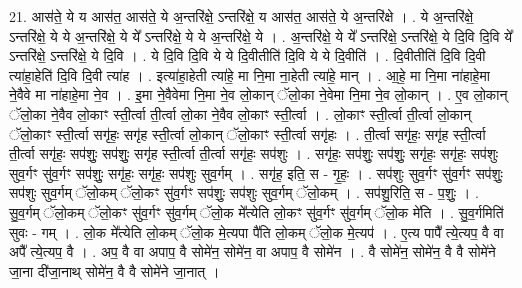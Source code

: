 \documentclass[17pt]{extarticle}
\begin{document}
21. आस॑ते॒ ये य आस॑त॒ आस॑ते॒ ये अ॒न्तरि॑क्षे॒ ऽन्तरि॑क्षे॒ य आस॑त॒ आस॑ते॒ ये अ॒न्तरि॑क्षे । . ये अ॒न्तरि॑क्षे॒ ऽन्तरि॑क्षे॒ ये ये अ॒न्तरि॑क्षे॒ ये ये᳚ ऽन्तरि॑क्षे॒ ये ये अ॒न्तरि॑क्षे॒ ये । . अ॒न्तरि॑क्षे॒ ये ये᳚ ऽन्तरि॑क्षे॒ ऽन्तरि॑क्षे॒ ये दि॒वि दि॒वि ये᳚ ऽन्तरि॑क्षे॒ ऽन्तरि॑क्षे॒ ये दि॒वि । . ये दि॒वि दि॒वि ये ये दि॒वीतीति॑ दि॒वि ये ये दि॒वीति॑ । . दि॒वीतीति॑ दि॒वि दि॒वी त्या॑हा॒हेति॑ दि॒वि दि॒वी त्या॑ह । . इत्या॑हा॒हेती त्या॑हे॒ मा नि॒मा ना॒हेती त्या॑हे॒ मान् । . आ॒हे॒ मा नि॒मा ना॑हाहे॒मा ने॒वैवे मा ना॑हाहे॒मा ने॒व । . इ॒मा ने॒वैवेमा नि॒मा ने॒व लो॒कान् ॅलो॒का ने॒वेमा नि॒मा ने॒व लो॒कान् । . ए॒व लो॒कान् ॅलो॒का ने॒वैव लो॒काꣳ स्ती॒र्त्वा ती॒र्त्वा लो॒का ने॒वैव लो॒काꣳ स्ती॒र्त्वा । . लो॒काꣳ स्ती॒र्त्वा ती॒र्त्वा लो॒कान् ॅलो॒काꣳ स्ती॒र्त्वा सगृ॑हः॒ सगृ॑ह स्ती॒र्त्वा लो॒कान् ॅलो॒काꣳ स्ती॒र्त्वा सगृ॑हः । . ती॒र्त्वा सगृ॑हः॒ सगृ॑ह स्ती॒र्त्वा ती॒र्त्वा सगृ॑हः॒ सप॑शुः॒ सप॑शुः॒ सगृ॑ह स्ती॒र्त्वा ती॒र्त्वा सगृ॑हः॒ सप॑शुः । . सगृ॑हः॒ सप॑शुः॒ सप॑शुः॒ सगृ॑हः॒ सगृ॑हः॒ सप॑शुः सुव॒र्गꣳ सु॑व॒र्गꣳ सप॑शुः॒ सगृ॑हः॒ सगृ॑हः॒ सप॑शुः सुव॒र्गम् । . सगृ॑ह॒ इति॒ स - गृ॒हः॒ । . सप॑शुः सुव॒र्गꣳ सु॑व॒र्गꣳ सप॑शुः॒ सप॑शुः सुव॒र्गम् ॅलो॒कम् ॅलो॒कꣳ सु॑व॒र्गꣳ सप॑शुः॒ सप॑शुः सुव॒र्गम् ॅलो॒कम् । . सप॑शु॒रिति॒ स - प॒शुः॒ । . सु॒व॒र्गम् ॅलो॒कम् ॅलो॒कꣳ सु॑व॒र्गꣳ सु॑व॒र्गम् ॅलो॒क मे᳚त्येति लो॒कꣳ सु॑व॒र्गꣳ सु॑व॒र्गम् ॅलो॒क मे॑ति । . सु॒व॒र्गमिति॑ सुवः - गम् । . लो॒क मे᳚त्येति लो॒कम् ॅलो॒क मे॒त्यपा पै॑ति लो॒कम् ॅलो॒क मे॒त्यप॑ । . ए॒त्य पापै᳚ त्ये॒त्यप॒ वै वा अपै᳚ त्ये॒त्यप॒ वै । . अप॒ वै वा अपाप॒ वै सोमे॑न॒ सोमे॑न॒ वा अपाप॒ वै सोमे॑न । . वै सोमे॑न॒ सोमे॑न॒ वै वै सोमे॑ने जा॒ना दी॑जा॒नाथ् सोमे॑न॒ वै वै सोमे॑ने जा॒नात् । \newline
\end{document}
